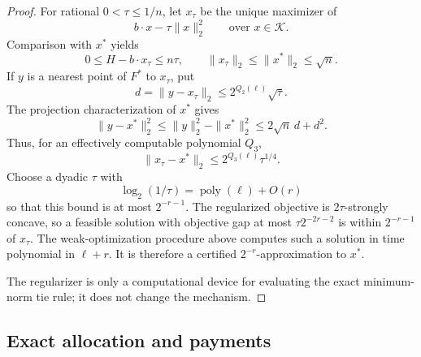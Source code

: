 \documentclass[11pt]{article}
\begin{document}
\begin{proof}
For rational $0<\tau\le1/n$, let $x_\tau$ be the unique
maximizer of
\[
b\cdot x-\tau\|x\|_2^2
\qquad\text{over }x\in\mathcal K.
\]
Comparison with $x^*$ yields
\[
0\le H-b\cdot x_\tau\le n\tau,
\qquad
\|x_\tau\|_2\le\|x^*\|_2\le\sqrt n.
\]
If $y$ is a nearest point of $F^*$ to $x_\tau$, put
\[
d=\|y-x_\tau\|_2
\le2^{Q_2(\ell)}\sqrt{\tau}.
\]
The projection characterization of $x^*$ gives
\[
\|y-x^*\|_2^2
\le
\|y\|_2^2-\|x^*\|_2^2
\le
2\sqrt n\,d+d^2.
\]
Thus, for an effectively computable polynomial $Q_3$,
\begin{equation}
\label{eq:comp-canonical-error}
\|x_\tau-x^*\|_2
\le2^{Q_3(\ell)}\tau^{1/4}.
\end{equation}
Choose a dyadic $\tau$ with
\[
\log_2(1/\tau)
=
\operatorname{poly}(\ell)+O(r)
\]
so that this bound is at most $2^{-r-1}$.
The regularized objective is $2\tau$-strongly concave, so a
feasible solution with objective gap at most $\tau2^{-2r-2}$
is within $2^{-r-1}$ of $x_\tau$.
The weak-optimization procedure above computes such a solution
in time polynomial in $\ell+r$.
It is therefore a certified $2^{-r}$-approximation to $x^*$.

The regularizer is only a computational device for evaluating
the exact minimum-norm tie rule; it does not change the
mechanism.
\end{proof}

\subsection{Exact allocation and payments}
\end{document}
